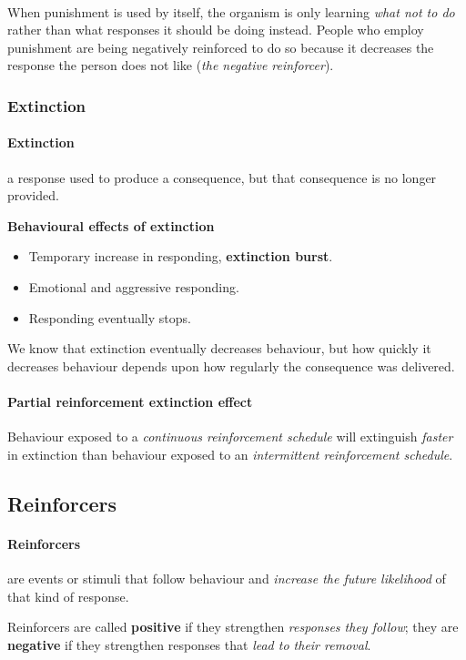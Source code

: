 \documentclass{article}
\begin{document}
	\paragraph{} When punishment is used by itself, the organism is only learning \emph{what not to do} rather than what responses it should be doing instead. People who employ punishment are being negatively reinforced to do so because it decreases the response the person does not like (\emph{the negative reinforcer}).
	\subsubsection{Extinction} 
	\paragraph{Extinction} a response used to produce a consequence, but that consequence is no longer provided.
	
	\textbf{Behavioural effects of extinction}
	\begin{itemize}
		\item Temporary increase in responding, \textbf{extinction burst}.
		\item Emotional and aggressive responding.
		\item Responding eventually stops.
	\end{itemize}
	
	We know that extinction eventually decreases behaviour, but how quickly it decreases behaviour depends upon how regularly the consequence was delivered.
	\paragraph{Partial reinforcement extinction effect} Behaviour exposed to a \emph{continuous reinforcement schedule} will extinguish \emph{faster} in extinction than behaviour exposed to an \emph{intermittent reinforcement schedule}.
	\subsection{Reinforcers}
	\paragraph{Reinforcers} are events or stimuli that follow behaviour and \emph{increase the future likelihood} of that kind of response.
	
	Reinforcers are called \textbf{positive} if they strengthen \emph{responses they follow}; they are \textbf{negative} if they strengthen responses that \emph{lead to their removal}.
	
\end{document}
